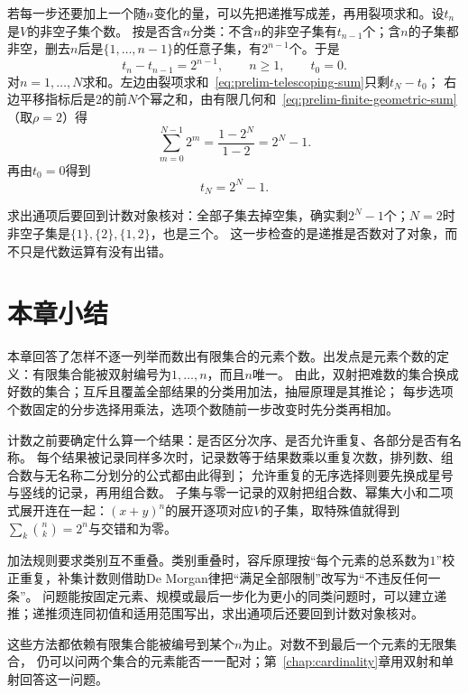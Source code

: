 若每一步还要加上一个随$n$变化的量，可以先把递推写成差，再用裂项求和。设$t_n$是$V$的非空子集个数。
按是否含$n$分类：不含$n$的非空子集有$t_{n-1}$个；含$n$的子集都非空，删去$n$后是$\{1,\ldots,n-1\}$的任意子集，有$2^{n-1}$个。于是
\[
 t_n-t_{n-1}=2^{n-1},\qquad n\geq1,\qquad t_0=0.
\]
对$n=1,\ldots,N$求和。左边由裂项求和~\eqref{eq:prelim-telescoping-sum}只剩$t_N-t_0$；
右边平移指标后是$2$的前$N$个幂之和，由有限几何和~\eqref{eq:prelim-finite-geometric-sum}（取$\rho=2$）得
\[
 \sum_{m=0}^{N-1}2^m=\frac{1-2^N}{1-2}=2^N-1.
\]
再由$t_0=0$得到
\[
 t_N=2^N-1.
\]

求出通项后要回到计数对象核对：全部子集去掉空集，确实剩$2^N-1$个；$N=2$时非空子集是$\{1\},\{2\},\{1,2\}$，也是三个。
这一步检查的是递推是否数对了对象，而不只是代数运算有没有出错。

\section{本章小结}
\label{sec:comb-summary}

本章回答了怎样不逐一列举而数出有限集合的元素个数。出发点是元素个数的定义：有限集合能被双射编号为$1,\ldots,n$，而且$n$唯一。
由此，双射把难数的集合换成好数的集合；互斥且覆盖全部结果的分类用加法，抽屉原理是其推论；
每步选项个数固定的分步选择用乘法，选项个数随前一步改变时先分类再相加。

计数之前要确定什么算一个结果：是否区分次序、是否允许重复、各部分是否有名称。
每个结果被记录同样多次时，记录数等于结果数乘以重复次数，排列数、组合数与无名称二分划分的公式都由此得到；
允许重复的无序选择则要先换成星号与竖线的记录，再用组合数。
子集与零一记录的双射把组合数、幂集大小和二项式展开连在一起：$(x+y)^n$的展开逐项对应$V$的子集，取特殊值就得到$\sum_k\binom nk=2^n$与交错和为零。

加法规则要求类别互不重叠。类别重叠时，容斥原理按“每个元素的总系数为$1$”校正重复，补集计数则借助De Morgan律把“满足全部限制”改写为“不违反任何一条”。
问题能按固定元素、规模或最后一步化为更小的同类问题时，可以建立递推；递推须连同初值和适用范围写出，求出通项后还要回到计数对象核对。

这些方法都依赖有限集合能被编号到某个$n$为止。对数不到最后一个元素的无限集合，
仍可以问两个集合的元素能否一一配对；第~\ref{chap:cardinality}章用双射和单射回答这一问题。
